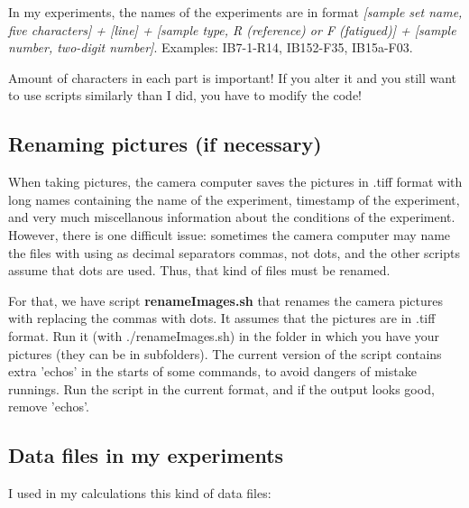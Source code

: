 \documentclass[a4paper]{article}
\begin{document}
In my experiments, the names of the experiments are in format 
\textit{[sample set name, five characters] + [line] + [sample type, 
R (reference) or F (fatigued)] + [sample number, two-digit number]}. 
Examples: IB7-1-R14, IB152-F35, IB15a-F03. 

Amount of characters in each part is important! If you alter it and 
you still want to use scripts similarly than I did, you have to 
modify the code!

\subsection{Renaming pictures (if necessary)}

When taking pictures, the camera computer saves the pictures in 
.tiff format with long names containing the name of the experiment, 
timestamp of the experiment, and very much miscellanous information 
about the conditions of the experiment. However, there is one difficult 
issue: sometimes the camera computer may name the files with using as 
decimal separators commas, not dots, and the other scripts assume that 
dots are used. Thus, that kind of files must be renamed.

For that, we have script \textbf{renameImages.sh} that renames the camera 
pictures with replacing the commas with dots. It assumes that the pictures 
are in .tiff format. Run it (with \textsf{./renameImages.sh}) in the 
folder in which you have your pictures (they can be in subfolders). The 
current version of the script contains extra 'echos' in the starts of some 
commands, to avoid dangers of mistake runnings. Run the script in the 
current format, and if the output looks good, remove 'echos'.

\subsection{Data files in my experiments}

I used in my calculations this kind of data files:
\end{document}
